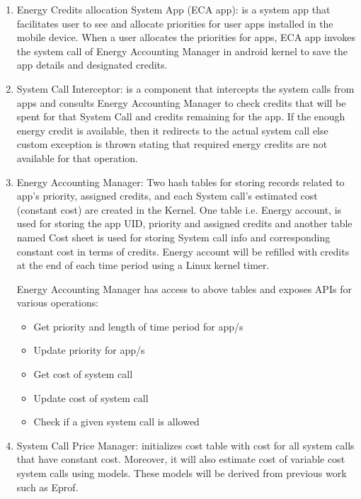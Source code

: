\begin{enumerate}

\item Energy Credits allocation System App (ECA app): is a system app that facilitates user to see and allocate priorities for user apps installed in the mobile device. When a user allocates the priorities for apps, ECA app invokes the system call of Energy Accounting Manager in android kernel to save the app details and designated credits.

\item System Call Interceptor: is a component that intercepts the system calls from apps and consults Energy Accounting Manager to check credits that will be spent for that System Call and credits remaining for the app. If the enough energy credit is available, then it redirects to the actual system call else custom exception is thrown stating that required energy credits are not available for that operation.

\item Energy Accounting Manager: Two hash tables for storing records related to app's priority, assigned credits, and each System call's estimated cost (constant cost) are created in the Kernel. One table i.e. Energy account, is used for storing the app UID, priority and assigned credits and another table named Cost sheet is used for storing System call info and corresponding constant cost in terms of credits. Energy account will be refilled with credits at the end of each time period using a Linux kernel timer.

Energy Accounting Manager has access to above tables and exposes APIs for various operations:

\begin{itemize}
\item Get priority and length of time period for app/s
\item Update priority for app/s
\item Get cost of system call
\item Update cost of system call
\item Check if a given system call is allowed
\end{itemize}


\item System Call Price Manager: initializes cost table with cost for all system calls that have constant cost. Moreover, it will also estimate cost of variable cost system calls using models. These models will be derived from previous work such as Eprof.


\end{enumerate}

